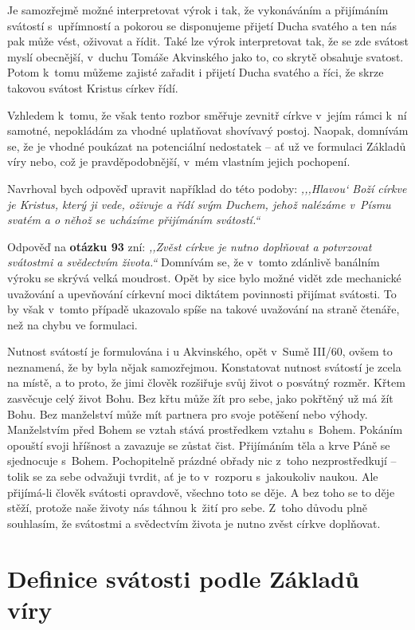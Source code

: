 Je samozřejmě možné interpretovat výrok i tak, že vykonáváním a přijímáním
svátostí s~upřímností a pokorou se disponujeme přijetí Ducha svatého a ten nás
pak může vést, oživovat a řídit. Také lze výrok interpretovat tak, že se zde
svátost myslí obecnější, v~duchu Tomáše Akvinského jako to, co skrytě obsahuje
svatost. Potom k~tomu můžeme zajisté zařadit i přijetí Ducha svatého a říci, že
skrze takovou svátost Kristus církev řídí.

Vzhledem k~tomu, že však tento rozbor směřuje zevnitř církve v~jejím rámci k~ní
samotné, nepokládám za vhodné uplatňovat shovívavý postoj. Naopak, domnívám se,
že je vhodné poukázat na potenciální nedostatek -- ať už ve formulaci Základů
víry nebo, což je pravděpodobnější, v~mém vlastním jejich pochopení.

Navrhoval bych odpověď upravit například do této podoby: \textit{,,,Hlavou` Boží
církve je Kristus, který ji vede, oživuje a řídí svým Duchem, jehož nalézáme
v~Písmu svatém a o něhož se ucházíme přijímáním svátostí.``}

Odpověď na \textbf{otázku 93} zní: \textit{,,Zvěst církve je nutno doplňovat a potvrzovat
svátostmi a svědectvím života.``} Domnívám se, že v~tomto zdánlivě banálním
výroku se skrývá velká moudrost. Opět by sice bylo možné vidět zde mechanické
uvažování a upevňování církevní moci diktátem povinnosti přijímat svátosti. To
by však v~tomto případě ukazovalo spíše na takové uvažování na straně čtenáře,
než na chybu ve formulaci.

Nutnost svátostí je formulována i u Akvinského, opět v~Sumě III/60, ovšem to
neznamená, že by byla nějak samozřejmou. Konstatovat nutnost svátostí je zcela
na místě, a to proto, že jimi člověk rozšiřuje svůj život o posvátný rozměr.
Křtem zasvěcuje celý život Bohu. Bez křtu může žít pro sebe, jako pokřtěný už má
žít Bohu. Bez manželství může mít partnera pro svoje potěšení nebo výhody.
Manželstvím před Bohem se vztah stává prostředkem vztahu s~Bohem. Pokáním
opouští svoji hříšnost a zavazuje se zůstat čist. Přijímáním těla a krve Páně se
sjednocuje s~Bohem. Pochopitelně prázdné obřady nic z~toho nezprostředkují --
tolik se za sebe odvažuji tvrdit, ať je to v~rozporu s~jakoukoliv naukou. Ale
přijímá-li člověk svátosti opravdově, všechno toto se děje. A bez toho se to
děje stěží, protože naše životy nás táhnou k~žití pro sebe. Z~toho důvodu plně
souhlasím, že svátostmi a svědectvím života je nutno zvěst církve doplňovat.

\section{Definice svátosti podle Základů víry}

